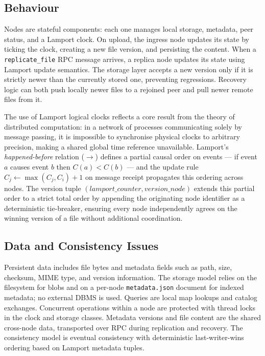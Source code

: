 \documentclass{scrartcl}
\begin{document}
\subsection{Behaviour}\label{behaviour}

Nodes are stateful components: each one manages local storage, metadata, peer status, and a Lamport clock. On upload, the ingress node updates its state by ticking the clock, creating a new file version, and persisting the content. When a \texttt{replicate\_file} RPC message arrives, a replica node updates its state using Lamport update semantics. The storage layer accepts a new version only if it is strictly newer than the currently stored one, preventing regressions. Recovery logic can both push locally newer files to a rejoined peer and pull newer remote files from it.

The use of Lamport logical clocks reflects a core result from the theory of distributed computation: in a network of processes communicating solely by message passing, it is impossible to synchronise physical clocks to arbitrary precision, making a shared global time reference unavailable. Lamport's \emph{happened-before} relation ($\rightarrow$) defines a partial causal order on events --- if event $a$ causes event $b$ then $C(a) < C(b)$ --- and the update rule $C_j \leftarrow \max(C_j, C_i) + 1$ on message receipt propagates this ordering across nodes. The version tuple $(lamport\_counter, version\_node)$ extends this partial order to a strict total order by appending the originating node identifier as a deterministic tie-breaker, ensuring every node independently agrees on the winning version of a file without additional coordination.

\subsection{Data and Consistency Issues}\label{data-and-consistency-issues}

Persistent data includes file bytes and metadata fields such as path, size, checksum, MIME type, and version information. The storage model relies on the filesystem for blobs and on a per-node \texttt{metadata.json} document for indexed metadata; no external DBMS is used. Queries are local map lookups and catalog exchanges. Concurrent operations within a node are protected with thread locks in the clock and storage classes. Metadata versions and file content are the shared cross-node data, transported over RPC during replication and recovery. The consistency model is eventual consistency with deterministic last-writer-wins ordering based on Lamport metadata tuples.
\end{document}
